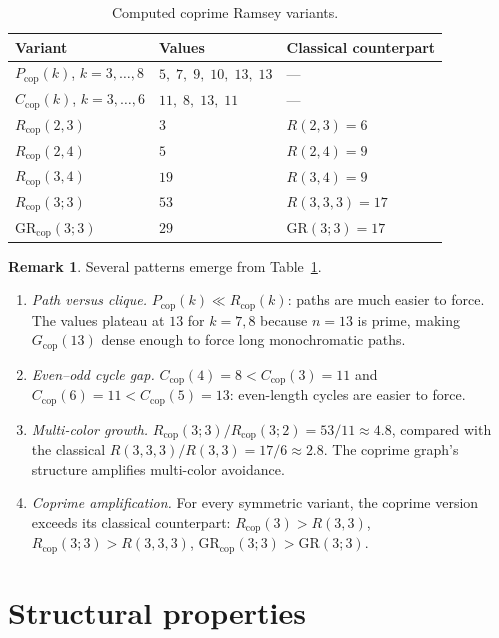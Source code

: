 \documentclass[11pt]{article}
\theoremstyle{plain}
\theoremstyle{definition}
\newtheorem{remark}[theorem]{Remark}
\newcommand{\Rcop}{R_{\mathrm{cop}}}
\newcommand{\Pcop}{P_{\mathrm{cop}}}
\newcommand{\Ccop}{C_{\mathrm{cop}}}
\newcommand{\GRcop}{\mathrm{GR}_{\mathrm{cop}}}
\newcommand{\Gcop}{G_{\mathrm{cop}}}
\begin{document}
\begin{table}[ht]
\centering
\caption{Computed coprime Ramsey variants.}\label{tab:variants}
\medskip
\begin{tabular}{@{}lll@{}}
\toprule
\textbf{Variant} & \textbf{Values} & \textbf{Classical counterpart} \\
\midrule
$\Pcop(k)$, $k=3,\ldots,8$ & $5,\; 7,\; 9,\; 10,\; 13,\; 13$ & --- \\[3pt]
$\Ccop(k)$, $k=3,\ldots,6$ & $11,\; 8,\; 13,\; 11$ & --- \\[3pt]
$\Rcop(2,3)$ & $3$ & $R(2,3) = 6$ \\
$\Rcop(2,4)$ & $5$ & $R(2,4) = 9$ \\
$\Rcop(3,4)$ & $19$ & $R(3,4) = 9$ \\[3pt]
$\Rcop(3;3)$ & $53$ & $R(3,3,3) = 17$ \\[3pt]
$\GRcop(3;3)$ & $29$ & $\mathrm{GR}(3;3) = 17$ \\
\bottomrule
\end{tabular}
\end{table}

\begin{remark}\label{rem:observations}
Several patterns emerge from Table~\ref{tab:variants}.
\begin{enumerate}
\item \emph{Path versus clique.} $\Pcop(k)\ll\Rcop(k)$: paths are much
  easier to force. The values plateau at $13$ for $k=7,8$ because
  $n=13$ is prime, making $\Gcop(13)$ dense enough to force long
  monochromatic paths.
\item \emph{Even--odd cycle gap.} $\Ccop(4)=8<\Ccop(3)=11$ and
  $\Ccop(6)=11<\Ccop(5)=13$: even-length cycles are easier to force.
\item \emph{Multi-color growth.}
  $\Rcop(3;3)/\Rcop(3;2)=53/11\approx 4.8$, compared with the
  classical $R(3,3,3)/R(3,3)=17/6\approx 2.8$. The coprime graph's
  structure amplifies multi-color avoidance.
\item \emph{Coprime amplification.} For every symmetric variant,
  the coprime version exceeds its classical counterpart:
  $\Rcop(3)>R(3,3)$, $\Rcop(3;3)>R(3,3,3)$,
  $\GRcop(3;3)>\mathrm{GR}(3;3)$.
\end{enumerate}
\end{remark}

\section{Structural properties}\label{sec:structure}
\end{document}

